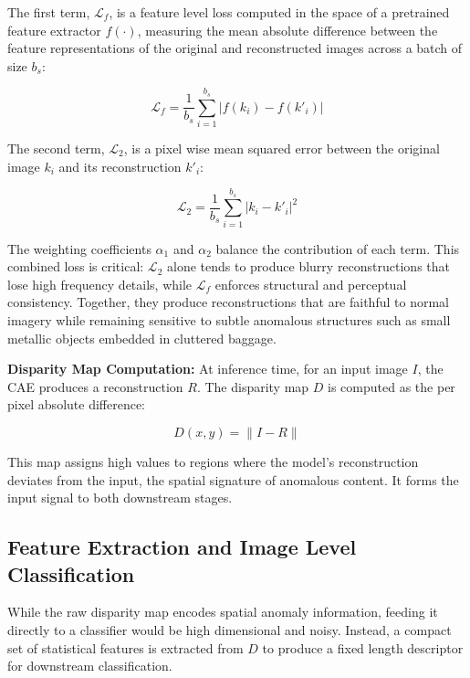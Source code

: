 \documentclass{bmvc2k}
\begin{document}
The first term, $\mathcal{L}_f$, is a feature level loss computed in the space of a pretrained feature extractor $f(\cdot)$, measuring the mean absolute difference between the feature representations of the original and reconstructed images across a batch of size $b_s$:

\begin{equation}
\mathcal{L}_f =
\frac{1}{b_s}
\sum_{i=1}^{b_s}
\left| f(k_i) - f(k'_i) \right|
\end{equation}

The second term, $\mathcal{L}_2$, is a pixel wise mean squared error between the original image $k_i$ and its reconstruction $k'_i$:

\begin{equation}
\mathcal{L}_2 =
\frac{1}{b_s}
\sum_{i=1}^{b_s}
\left| k_i - k'_i \right|^2
\end{equation}

The weighting coefficients $\alpha_1$ and $\alpha_2$ balance the contribution of each term. This combined loss is critical: $\mathcal{L}_2$ alone tends to produce blurry reconstructions that lose high frequency details, while $\mathcal{L}_f$ enforces structural and perceptual consistency. Together, they produce reconstructions that are faithful to normal imagery while remaining sensitive to subtle anomalous structures such as small metallic objects embedded in cluttered baggage.

\textbf{Disparity Map Computation:}
At inference time, for an input image $I$, the CAE produces a reconstruction $R$. The disparity map $D$ is computed as the per pixel absolute difference:

\begin{equation}
D(x,y) = \| I - R \|
\end{equation}

This map assigns high values to regions where the model's reconstruction deviates from the input, the spatial signature of anomalous content. It forms the input signal to both downstream stages.

\subsection{Feature Extraction and Image Level Classification}

While the raw disparity map encodes spatial anomaly information, feeding it directly to a classifier would be high dimensional and noisy. Instead, a compact set of statistical features is extracted from $D$ to produce a fixed length descriptor for downstream classification.
\end{document}
